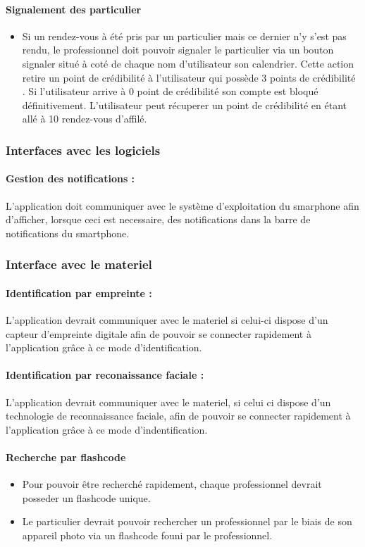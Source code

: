 \documentclass{article}
\begin{document}
\paragraph{Signalement des particulier}
\begin{itemize}
\item Si un rendez-vous à été pris par un particulier mais ce dernier
  n'y s'est pas rendu, le professionnel doit pouvoir
  signaler le particulier via un bouton \og signaler \fg{} situé
  à coté de chaque nom d'utilisateur son calendrier. Cette action retire un \og point de crédibilité \fg{} à l'utilisateur qui possède
  3 \og points de crédibilité \fg{}. Si l'utilisateur arrive à 0 point de crédibilité son compte est
  bloqué définitivement. L'utilisateur peut récuperer un point de crédibilité  en étant
  allé à 10 rendez-vous d'affilé.
\end{itemize}

\subsubsection{Interfaces avec les logiciels}
\paragraph{Gestion des notifications :}
L'application doit communiquer avec le système d'exploitation du
smarphone afin d'afficher, lorsque ceci est necessaire, des
notifications dans la barre de notifications du smartphone.

\subsubsection{Interface avec le materiel}
\paragraph{Identification par empreinte :}
L'application devrait communiquer avec le materiel si celui-ci dispose
d'un capteur d'empreinte digitale afin de pouvoir se connecter rapidement à
l'application grâce à ce mode d'identification.
\paragraph{Identification par reconaissance faciale :}
L'application devrait communiquer avec le materiel, si celui ci dispose
d'un technologie de reconnaissance faciale, afin de pouvoir se
connecter rapidement à l'application grâce à ce mode
d'indentification.
\paragraph{Recherche par flashcode}
\begin{itemize}
\item Pour pouvoir être recherché rapidement, chaque professionnel
  devrait posseder un flashcode unique.
\item Le particulier devrait pouvoir rechercher un professionnel par le
  biais de son appareil photo via un flashcode founi par le
  professionnel.
\end{itemize}
\end{document}
